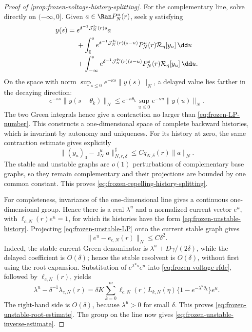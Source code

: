 \begin{proof}[Proof of \cref{prop:frozen-voltage-history-splitting}]
For the complementary line, solve directly on \((-\infty,0]\).  Given
\(a\in\Ran P_N^u(r)\), seek \(y\) satisfying
\begin{align}
 y(s)={}&e^{\delta^{-1}\mathcal J_N^{\rm fv}(r)s}a\notag\\
 &+\int_0^s e^{\delta^{-1}\mathcal J_N^{\rm fv}(r)(s-u)}P_N^u(r)
       \mathcal R_\eta[y_u]\,\dd u\notag\\
 &+\int_{-\infty}^s
       e^{\delta^{-1}\mathcal J_N^{\rm fv}(r)(s-u)}P_N^s(r)
       \mathcal R_\eta[y_u]\,\dd u.                 \label{eq:frozen-unstable-LP}
\end{align}
On the space with norm
\(\sup_{s\le0}e^{-\kappa s}\|y(s)\|_N\), a delayed value lies farther in
the decaying direction:
\begin{equation*}
 e^{-\kappa s}\|y(s-\theta_k)\|_N
 \le e^{-\kappa\theta_k}
       \sup_{u\le0}e^{-\kappa u}\|y(u)\|_N.
\end{equation*}
The two Green integrals hence give a contraction no larger than
\cref{eq:frozen-LP-number}.  This constructs a one-dimensional space of
complete backward histories, which is invariant by autonomy and uniqueness.
For its history at zero, the same contraction estimate gives explicitly
\begin{equation}
 \|(y_a)_0-\jmath_N^ua\|_{N,r,\delta}^{\sharp}
 \le Cq_{N,\delta}(r)\|a\|_N.                       \label{eq:frozen-unstable-graph-small}
\end{equation}
The stable and unstable graphs are \(o(1)\) perturbations of complementary
base graphs, so they remain complementary and their projections are bounded
by one common constant.  This proves
\cref{eq:frozen-repelling-history-splitting}.

For completeness, invariance of the one-dimensional line gives a continuous
one-dimensional group.  Hence there is a real \(\lambda^u\) and a normalized
current vector \(e^u\), with \(\ell_{c,N}(r)e^u=1\), for which its histories
have the form \cref{eq:frozen-unstable-history}.  Projecting
\cref{eq:frozen-unstable-LP} onto the current stable graph gives
\begin{equation}
 \|e^u-e_{c,N}(r)\|_N\le C\delta^2.                 \label{eq:frozen-unstable-vector-proof-bound}
\end{equation}
Indeed, the stable current Green denominator is
\(\lambda^u+D\gamma/(2\delta)\), while the delayed coefficient is
\(O(\delta)\); hence the stable resolvent is \(O(\delta)\), without first
using the root expansion.  Substitution of
\(e^{\lambda^us}e^u\) into \cref{eq:frozen-voltage-rfde}, followed by
\(\ell_{c,N}(r)\), yields
\begin{equation}
 \lambda^u-\delta^{-1}\lambda_{c,N}(r)
 =\delta K\sum_{k=0}^m\ell_{c,N}(r)L_{k,N}(\eta)
       \{1-e^{-\lambda^u\theta_k}\}e^u.            \label{eq:frozen-unstable-scalar-equation}
\end{equation}
The right-hand side is \(O(\delta)\), because \(\lambda^u>0\) for small
\(\delta\).  This proves \cref{eq:frozen-unstable-root-estimate}.  The group
on the line now gives
\cref{eq:frozen-unstable-inverse-estimate}.


\end{proof}
